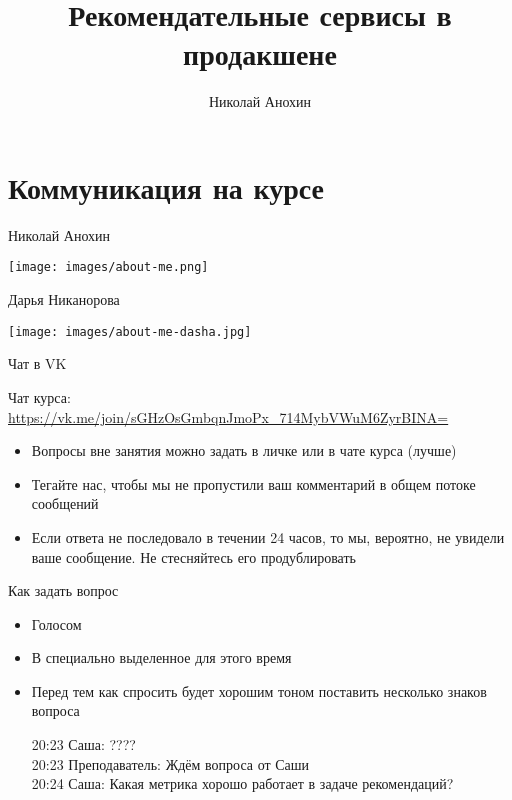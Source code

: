 \documentclass[11pt,aspectratio=169,handout]{beamer}
\author{Николай Анохин}
\title{Рекомендательные сервисы в продакшене}
\begin{document}
{

\begin{frame}
\titlepage
\end{frame}


}

\section{Коммуникация на курсе}

\begin{frame}{Николай Анохин}

\begin{center}
\texttt{[image: images/about-me.png]}
\end{center}

\end{frame}

\begin{frame}{Дарья Никанорова}

\begin{center}
\texttt{[image: images/about-me-dasha.jpg]}
\end{center}

\end{frame}

\begin{frame}{Чат в VK}

Чат курса: \url{https://vk.me/join/sGHzOsGmbqnJmoPx_714MybVWuM6ZyrBINA=}

\vfill

\begin{itemize}
\item Вопросы вне занятия можно задать в личке или в чате курса (лучше)
\item Тегайте нас, чтобы мы не пропустили ваш комментарий в общем потоке сообщений
\item Если ответа не последовало в течении 24 часов, то мы, вероятно, не увидели ваше сообщение. Не стесняйтесь его продублировать
\end{itemize}

\end{frame}

\begin{frame}{Как задать вопрос}

\begin{itemize}
\item Голосом
\item В специально выделенное для этого время
\item Перед тем как спросить будет хорошим тоном поставить несколько знаков вопроса
\begin{tcolorbox}[colback=gray!5,colframe=gray!80,title=]
20:23 Саша: ???? \\
20:23 Преподаватель: Ждём вопроса от Саши \\
20:24 Саша: Какая метрика хорошо работает в задаче рекомендаций?
\end{tcolorbox}
\end{itemize}

\end{frame}
\end{document}
